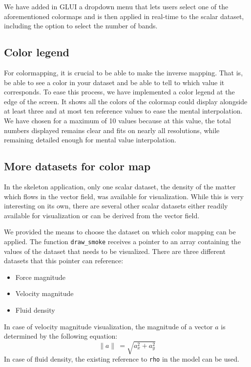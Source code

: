		We have added in GLUI a dropdown menu that lets users select one of the aforementioned colormaps and is then applied in real-time to the scalar dataset, including the option to select the number of bands.
	\subsection{Color legend}
		For colormapping, it is crucial to be able to make the inverse mapping. 
		That is, be able to see a color in your dataset and be able to tell to which value it corresponds. 
		To ease this process, we have implemented a color legend at the edge of the screen. 
		It shows all the colors of the colormap could display alongside at least three and at most ten reference values to ease the mental interpolation. 
		We have chosen for a maximum of 10 values because at this value, the total numbers displayed remains clear and fits on nearly all resolutions, while remaining detailed enough for mental value interpolation.
	\subsection{More datasets for color map}
		In the skeleton application, only one scalar dataset, the density of the matter which flows in the vector field, was available for visualization. 
		While this is very interesting on its own, there are several other scalar datasets either readily available for visualization or can be derived from the vector field.
		
		We provided the means to choose the dataset on which color mapping can be applied.
		The function \texttt{draw\_smoke} receives a pointer to an array containing the values of the dataset that needs to be visualized.
		There are three different datasets that this pointer can reference:
		\begin{itemize}
			\item Force magnitude
			\item Velocity magnitude
			\item Fluid density
		\end{itemize}
		In case of velocity magnitude visualization, the magnitude of a vector \(a\) is determined by the following equation:
		\[\| a \|\ = \sqrt{a_x^2 + a_y^2}\]
		In case of fluid density, the existing reference to \texttt{rho} in the model can be used.
